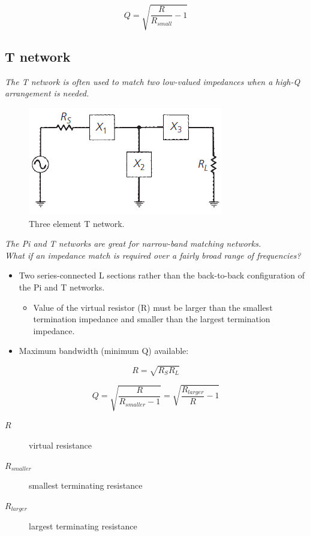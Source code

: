 \begin{equation}
Q = \sqrt{\dfrac{R}{R_{small}}-1}
\end{equation}


\subsection{T network}
\textit{The T network is often used to match two low-valued impedances when a high-Q arrangement is needed.}

\begin{figure} [H]
	\centering
	\includegraphics[width=0.6\linewidth]{graphics/28.png}
	\caption{Three element T network.}
	\label{fig:28}
\end{figure}

\noindent\textit{The Pi and T networks are great for narrow-band matching networks.\\
What if an impedance match is required over a fairly broad range of frequencies?}

\begin{itemize}
	\item Two series-connected L sections rather than the back-to-back configuration
	of the Pi and T networks.
	\begin{itemize}
		\item Value of the virtual resistor (R) must be larger than the smallest termination impedance and smaller than the largest termination
		impedance.
	\end{itemize}
	\item Maximum bandwidth (minimum Q) available:
\end{itemize}

\begin{equation}
R = \sqrt{R_S R_L}
\end{equation}

\begin{equation}
Q = \sqrt{\dfrac{R}{R_{smaller}-1}}= \sqrt{\dfrac{R_{larger}}{R}-1}
\end{equation}

\begin{description}
	\item[$R$] virtual resistance
	\item[$R_{smaller}$] smallest terminating resistance
	\item[$R_{larger}$] largest terminating resistance
\end{description}

